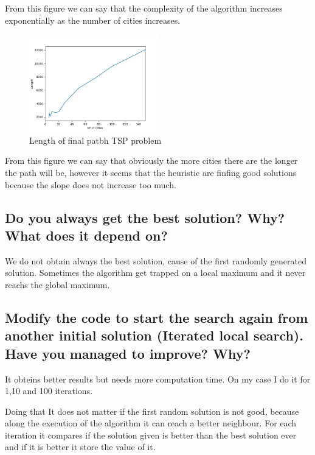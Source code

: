 \documentclass{article}
\begin{document}
        From this figure we can say that the complexity of the algorithm increases exponentially as the number of cities increases.

        \begin{figure}[H]

            \centering
            \includegraphics[width=0.5\textwidth]{../media/02.TSP-cities-length.png}
            \caption{Length of final patbh TSP problem}
            \label{Length of final patbh TSP problem}

        \end{figure}

        From this figure we can say that obviously the more cities there are the longer the path will be, however it seems that the heuristic 
        are finfing good solutions because the slope does not increase too much.


    \subsection{Do you always get the best solution? Why? What does it depend on?}

        We do not obtain always the best solution, cause of the first randomly generated solution.
        Sometimes the algorithm get trapped on a local maximum and it never reachs the global maximum.


    \subsection{Modify the code to start the search again from another initial solution (Iterated local search). Have you managed to improve? Why?}
        
        It obteins better results but needs more computation time.
        On my case I do it for 1,10 and 100 iterations.

        Doing that It does not matter if the first random solution is not good, because along the execution of the algorithm it can reach a better neighbour.
        For each iteration it compares if the solution given is better than the best solution ever and if it is better it store the value of it.
\end{document}
